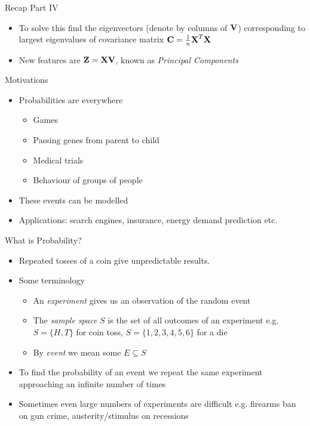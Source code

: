 \documentclass{beamer}
\begin{document}
\begin{frame}{Recap Part IV} 
\begin{itemize} 
 \item To solve this find the eigenvectors (denote by columns of $\textbf{V}$) corresponding to largest eigenvalues of covariance matrix $\textbf{C} = \frac{1}{n}\textbf{X}^T\textbf{X}$ 
 \item New features are $\textbf{Z} = \textbf{X}\textbf{V}$, known as \emph{Principal Components}
\end{itemize}
\end{frame}


\begin{frame}{Motivations}
\begin{itemize} 
 \item Probabilities are everywhere 
 \begin{itemize}
 \item Games
 \item Passing genes from parent to child 
 \item Medical trials
 \item Behaviour of groups of people 
 \end{itemize} 
\item These events can be modelled 
\item Applications: search engines, insurance, energy demand prediction etc. 
\end{itemize}
\end{frame}

\begin{frame}{What is Probability?} 
\begin{itemize}
 \item Repeated tosses of a coin give unpredictable results. 
 \item Some terminology 
 \begin{itemize}
 \item An \emph{experiment} gives us an observation of the random event
 \item The \emph{sample space} $S$ is the set of all outcomes of an experiment e.g. $S = \{H, T\}$ for coin toss, $S = \{1,2,3,4,5,6\}$ for a die  
 \item By \emph{event} we mean some $E \subseteq S$ 
 \end{itemize} 
 \item To find the probability of an event we repeat the same experiment approaching an infinite number of times 
 \item Sometimes even large numbers of experiments are difficult e.g. firearms ban on gun crime,  austerity/stimulus on recessions 
\end{itemize}
\end{frame}
\end{document}
